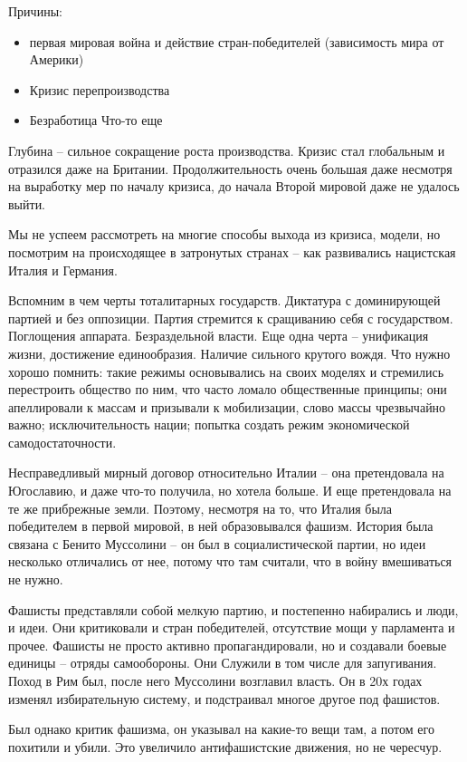 \documentclass[a4paper, 12pt]{article}
\begin{document}
\begin{multicols}{2}
Причины: 
\begin{itemize}
\item первая мировая война и действие стран-победителей (зависимость мира от Америки)
\item Кризис перепроизводства 
\item Безработица
Что-то еще 
\end{itemize}

Глубина -- сильное сокращение роста производства. Кризис стал глобальным и отразился даже на Британии. Продолжительность очень большая даже несмотря на выработку мер по началу кризиса, до начала Второй мировой даже не удалось выйти. 

Мы не успеем рассмотреть на многие способы выхода из кризиса, модели, но посмотрим на происходящее в затронутых странах -- как развивались нацистская Италия и Германия. 

Вспомним в чем черты тоталитарных государств. Диктатура с доминирующей партией и без оппозиции. Партия стремится к сращиванию себя с государством. Поглощения аппарата. Безраздельной власти. Еще одна черта -- унификация жизни, достижение единообразия. Наличие сильного крутого вождя. Что нужно хорошо помнить: такие режимы основывались на своих моделях и стремились перестроить общество по ним, что часто ломало общественные принципы; они апеллировали к массам и призывали к мобилизации, слово массы чрезвычайно важно; исключительность нации; попытка создать режим экономической самодостаточности. 

Несправедливый мирный договор относительно Италии -- она претендовала на Югославию, и даже что-то получила, но хотела больше. И еще претендовала на те же прибрежные земли. Поэтому, несмотря на то, что Италия была победителем в первой мировой, в ней образовывался фашизм. История была связана с Бенито Муссолини -- он был в социалистической партии, но идеи несколько отличались от нее, потому что там считали, что в войну вмешиваться не нужно. 

Фашисты представляли собой мелкую партию, и постепенно набирались и люди, и идеи. Они критиковали и стран победителей, отсутствие мощи у парламента и прочее. Фашисты не просто активно пропагандировали, но и создавали боевые единицы -- отряды самообороны. Они Служили в том числе для запугивания. Поход в Рим был, после него Муссолини возглавил власть. Он в 20х годах изменял избирательную систему, и подстраивал многое другое под фашистов. 

Был однако критик фашизма, он указывал на какие-то вещи там, а потом его похитили и убили. Это увеличило антифашистские движения, но не чересчур. 


\end{multicols}
\end{document}
